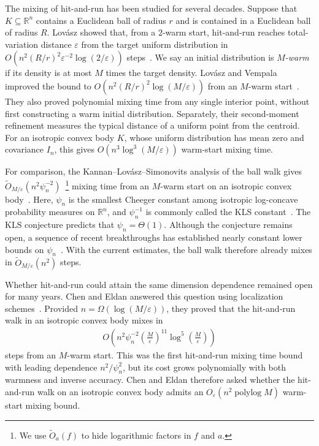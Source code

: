 \documentclass[11pt]{article}
\theoremstyle{definition}
\theoremstyle{remark}
\newcommand{\R}{\mathbb R}
\begin{document}
The mixing of hit-and-run has been studied for several decades. Suppose that \(K\subseteq\R^n\) contains a Euclidean ball of radius \(r\) and is contained in a Euclidean ball of radius \(R\).  Lov\'asz showed that, from a \(2\)-warm start, hit-and-run reaches total-variation distance \(\varepsilon\) from the target uniform distribution in $O(n^2(R/r)^2\varepsilon^{-2}\log(2/\varepsilon))$ steps~\cite{LovaszHR}. We say an initial distribution is \emph{$M$-warm} if its density is at most $M$ times the target density. Lov\'asz and Vempala improved the bound to $O(n^2(R/r)^2\log(M/\varepsilon))$ from an \(M\)-warm start~\cite{LV}. They also proved polynomial mixing time from any single interior point, without first constructing a warm initial distribution.  Separately, their second-moment refinement measures the typical distance of a uniform point from the centroid.  For an isotropic convex body $K$, whose uniform distribution has mean zero and covariance $I_n$, this gives $O(n^3\log^3(M/\varepsilon))$ warm-start mixing time.

For comparison, the Kannan--Lov\'asz--Simonovits analysis of the ball walk gives $\widetilde{O}_{M/\varepsilon}(n^2\psi_n^{-2})$~\footnote{We use $\widetilde{O}_a(f)$ to hide logarithmic factors in $f$ and $a$.} mixing time from an $M$-warm start on an isotropic convex body~\cite{KLS97,JLLV26}.  Here, \(\psi_n\) is the smallest Cheeger constant among isotropic log-concave probability measures on \(\R^n\), and \(\psi_n^{-1}\) is commonly called the KLS constant~\cite{KLS95}.  The KLS
conjecture predicts that \(\psi_n=\Theta(1)\).  Although the conjecture
remains open, a sequence of recent breakthroughs has established nearly constant lower bounds on $\psi_n$~\cite{ChenKLS,KlartagLehecKLS,KlartagKLS,LetwinKLS}.  With the current estimates, the ball walk therefore already mixes in \(\widetilde{O}_{M/\varepsilon}(n^2)\) steps.

Whether hit-and-run could attain the same dimension dependence remained open for many years.  Chen and Eldan answered this question using localization schemes~\cite {CE}. Provided $n=\Omega(\log(M/\varepsilon))$, they proved that the hit-and-run walk in an isotropic convex body mixes in
\begin{align}\label{eq:mixing_CE}
 O\!\left(
 n^2\psi_n^{-2}
 \left(\frac{M}{\varepsilon}\right)^{11}
 \log^5\!\left(\frac{M}{\varepsilon}\right)
 \right)
\end{align}
steps from an \(M\)-warm start.  This was the first hit-and-run mixing time bound with leading dependence $n^2/\psi_n^2$, but its cost grows polynomially with both warmness and inverse accuracy.  Chen and Eldan therefore asked whether the hit-and-run walk on an isotropic convex body admits an $O_{\varepsilon}\!\left(n^2\operatorname{polylog} M\right)$ warm-start mixing bound.
\end{document}
